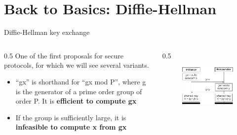 \documentclass[11pt,aspectratio=169]{beamer}
\begin{document}

\section{Back to Basics: Diffie-Hellman}


\begin{frame}[fragile]{Diffie-Hellman key exchange}
    \begin{columns}
        \begin{column}{0.5\hsize}
        One of the first proposals for secure protocols, for which we will see 
        several variants.
        \begin{itemize}
            \item ``g\pow{}x'' is shorthand for ``gx mod P'', where g is the 
                    generator of a prime order group of order P. It is
                    \textbf{efficient to compute g\pow{}x}
            \item If the group is sufficiently large, it is
                  \textbf{infeasible to compute x from g\pow{}x}
        \end{itemize}
        \end{column}
        \begin{column}{0.5\hsize}
            \begin{figure}
                \includegraphics[width=\textwidth]{./figures/lecture_0/dh}
            \end{figure}
        \end{column}
    \end{columns}
\end{frame}
\end{document}
